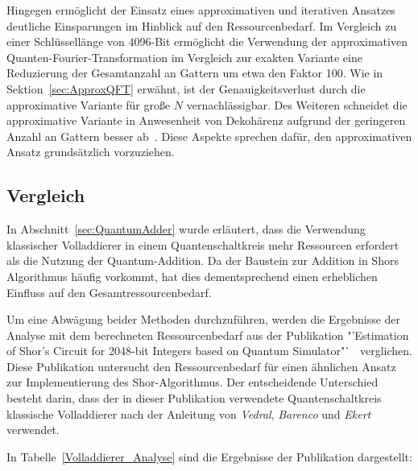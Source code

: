 Hingegen ermöglicht der Einsatz eines approximativen und iterativen Ansatzes deutliche Einsparungen im Hinblick auf den Ressourcenbedarf. 
Im Vergleich zu einer Schlüssellänge von 4096-Bit ermöglicht die Verwendung der approximativen Quanten-Fourier-Transformation im Vergleich zur exakten Variante eine Reduzierung der Gesamtanzahl an Gattern um etwa den Faktor 100.
Wie in Sektion~\ref{sec:ApproxQFT} erwähnt, ist der Genauigkeitsverlust durch die approximative Variante für große \(N\) vernachlässigbar. 
Des Weiteren schneidet die approximative Variante in Anwesenheit von Dekohärenz aufgrund der geringeren Anzahl an Gattern besser ab~\cite{Barenco_1996}. 
Diese Aspekte sprechen dafür, den approximativen Ansatz grundsätzlich vorzuziehen.

\subsection*{Vergleich}
In Abschnitt~\ref{sec:QuantumAdder} wurde erläutert, 
dass die Verwendung klassischer Volladdierer in einem Quantenschaltkreis mehr Ressourcen erfordert als die Nutzung der Quantum-Addition. 
Da der Baustein zur Addition in Shors Algorithmus häufig vorkommt, 
hat dies dementsprechend einen erheblichen Einfluss auf den Gesamtressourcenbedarf.

Um eine Abwägung beider Methoden durchzuführen, 
werden die Ergebnisse der Analyse mit dem berechneten Ressourcenbedarf aus der Publikation "'Estimation of Shor’s Circuit for 2048-bit Integers
based on Quantum Simulator"`~\cite{cryptoeprint:2023/092} verglichen. 
Diese Publikation untersucht den Ressourcenbedarf für einen ähnlichen Ansatz zur Implementierung des Shor-Algorithmus.
Der entscheidende Unterschied besteht darin, 
dass der in dieser Publikation verwendete Quantenschaltkreis klassische Volladdierer nach der Anleitung von 
\textit{Vedral}, \textit{Barenco} und \textit{Ekert}\cite{Vedral_1996} verwendet.

In Tabelle~\ref{Volladdierer_Analyse} sind die Ergebnisse der Publikation dargestellt:

